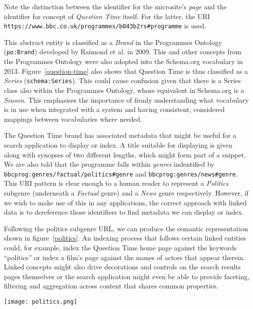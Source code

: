 Note the distinction between the identifier for the microsite's
\emph{page} and the identifier for concept of \emph{Question Time}
itself. For the latter, the URI
\texttt{https://www.bbc.co.uk/programmes/b043b2rs\#programme}
is used.\cite{raimond2010use}

This abstract entity is classified as a \emph{Brand} in the
Programmes Ontology\cite{raimond2009bbc} (\texttt{po:Brand})
developed by Raimond et al. in 2009. This and other concepts
from the Programmes Ontology were also adopted into the
Schema.org vocabulary in 2013.\cite{raimond2013schema}
Figure~\ref{question-time} also shows
that Question Time is thus classified as a \emph{Series}
(\texttt{schema:Series}). This could cause confusion given
that there is a Series class also within the Programmes Ontology,
whose equivalent in Schema.org is a \emph{Season}. This emphasises
the importance of firmly understanding what vocabulary is in use
when integrated with a system and having consistent, considered
mappings between vocabularies where needed.

The Question Time brand has associated metadata that might
be useful for a search application to display or index. A title
suitable for displaying is given along with synopses of two
different lengths, which might form part of a snippet. We are also
told that the programme falls within \emph{genres} indentified
by \texttt{bbcprog:genres/factual/politics\#genre} and
\texttt{bbcprog:genres/news\#genre}. This URI pattern is
clear enough to a human reader to represent a \emph{Politics}
subgenre (underneath a \emph{Factual} genre) and a
\emph{News} genre respectively. However, if we wish to make
use of this in any applications, the correct approach with
linked data is to dereference those identifiers to find
metadata we can display or index.

Following the politics subgenre URL, we can produce the
semantic representation shown in figure~\ref{politics}.
An indexing process that follows certain linked entities
could, for example, index the Question Time home page
against the keywords ``politics'' or index a film's
page against the names of actors that appear therein.
Linked concepts might also drive decorations and controls
on the search results pages themselves or the search
application might even be able to provide faceting, filtering
and aggregation across content that shares common properties.

\begin{sidewaysfigure}
  \begin{center}
    \texttt{[image: politics.png]}
  \end{center}
  \caption{Semantic metadata around the \emph{Politics} programme genre}
  \label{politics}
\end{sidewaysfigure}

